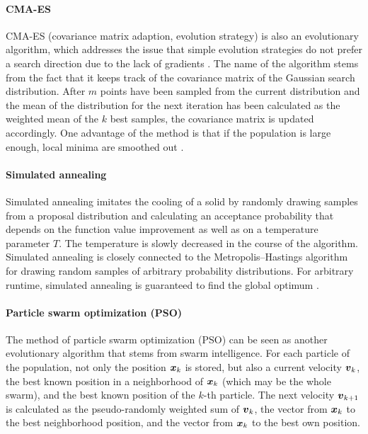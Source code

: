 \paragraph{CMA-ES}

CMA-ES (covariance matrix adaption, evolution strategy)
\cite{Hansen03Reducing}
is also an evolutionary algorithm,
which addresses the issue
that simple evolution strategies do not prefer a search direction
due to the lack of gradients \cite{Toussaint15Introduction}.
The name of the algorithm stems from the fact
that it keeps track of the covariance matrix of the
Gaussian search distribution.
After $m$ points have been sampled from the current distribution and
the mean of the distribution for the next iteration
has been calculated as the weighted mean of the $k$ best samples,
the covariance matrix is updated accordingly.
One advantage of the method is that if the population is large enough,
local minima are smoothed out \cite{Toussaint15Introduction}.

\paragraph{Simulated annealing}

Simulated annealing
imitates the cooling of a solid by randomly drawing samples
from a proposal distribution and calculating an acceptance
probability that depends on the function value improvement as well as
on a temperature parameter $T$.
The temperature is slowly decreased in the course of the algorithm.
Simulated annealing is closely connected to the
Metropolis--Hastings algorithm for drawing random samples of arbitrary
probability distributions.
For arbitrary runtime,
simulated annealing is guaranteed to find the global
optimum \cite{Toussaint15Introduction}.

\paragraph{Particle swarm optimization (PSO)}

The method of particle swarm optimization (PSO)
can be seen as another evolutionary algorithm
that stems from swarm intelligence.
For each particle of the population,
not only the position ${\boldsymbol{x}}_k$ is stored,
but also a current velocity ${\boldsymbol{v}}_k$,
the best known position in a neighborhood of ${\boldsymbol{x}}_k$
(which may be the whole swarm), and
the best known position of the $k$-th particle.
The next velocity ${\boldsymbol{v}}_{k+1}$ is calculated as
the pseudo-randomly weighted sum of ${\boldsymbol{v}}_k$,
the vector from ${\boldsymbol{x}}_k$ to the best neighborhood position, and
the vector from ${\boldsymbol{x}}_k$ to the best own position.

